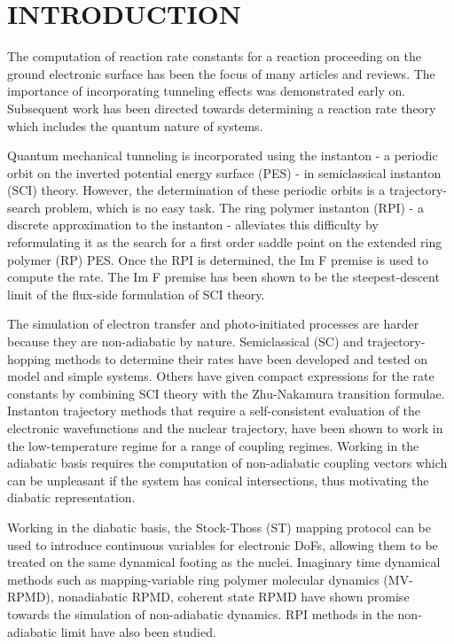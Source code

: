 \documentclass[%
 aip,
 jmp,%
 amsmath,amssymb,
reprint,%
]{revtex4-1}
\begin{document}
\section{\label{sec:level1}INTRODUCTION}
The computation of reaction rate constants for a reaction proceeding on the ground electronic surface has been the focus of many articles and reviews\cite{Eyring1935}. The importance of incorporating tunneling effects was demonstrated early on\cite{Wigner1938}. Subsequent work has been directed towards determining a reaction rate theory which includes the quantum nature of systems\cite{Pechukas1981, Truhlar1983, Pollak2005,Chapman1975, Hele2013, Richardson2017}. \par
Quantum mechanical tunneling is incorporated using the instanton - a periodic orbit on the inverted potential energy surface (PES) - in semiclassical instanton (SCI) theory\cite{Chapman1975}. However, the determination of these periodic orbits is a trajectory-search problem, which is no easy task. The ring polymer instanton (RPI) - a discrete approximation to the instanton - alleviates this difficulty by reformulating it as the search for a first order saddle point on the extended ring polymer (RP) PES\cite{Richardson2009}. Once the RPI is determined, the Im F premise is used to compute the rate. The Im F premise has been shown to be the steepest-descent limit of the flux-side formulation of SCI theory\cite{Althorpe2011}. 

The simulation of electron transfer and photo-initiated processes are harder because they are non-adiabatic by nature\cite{Marcus1985, Sutin2007, Gray1996}.  Semiclassical (SC)\cite{Topaler1996, Neria1993} and trajectory-hopping\cite{Tully1990} methods to determine their rates have been developed and tested on model and simple systems. Others have given compact expressions for the rate constants by combining SCI theory with the Zhu-Nakamura transition formulae\cite{Teranishi2012}. Instanton trajectory methods that require a self-consistent evaluation of the electronic wavefunctions and the nuclear trajectory, have been shown to work in the low-temperature regime\cite{Cao1995, Cao1997, Jang2001} for a range of coupling regimes.  Working in the adiabatic basis requires the computation of non-adiabatic coupling vectors which can be unpleasant if the system has conical intersections\cite{Yarkony1996}, thus motivating the diabatic representation. 

Working in the diabatic basis, the Stock-Thoss (ST) mapping protocol\cite{Stock1997} can be used to introduce continuous variables for  electronic DoFs, allowing them to be treated on the same dynamical footing as the nuclei. Imaginary time dynamical methods such as mapping-variable ring polymer molecular dynamics (MV-RPMD)\cite{Ananth2013}, nonadiabatic RPMD\cite{Richardson2013}, coherent state RPMD\cite{Chowdhury2017} have shown promise towards the simulation of non-adiabatic dynamics. RPI methods in the non-adiabatic limit have also been studied\cite{Richardson2015a,Richardson2015b}. 
\end{document}
